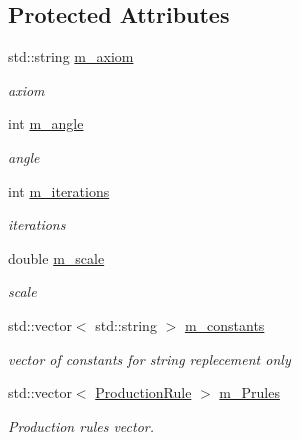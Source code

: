 \subsection*{Protected Attributes}
\begin{DoxyCompactItemize}
\item 
\mbox{\label{class_l_sys_a47cedddf1400255ec6f20f36af55417e}} 
std\+::string \hyperlink{class_l_sys_a47cedddf1400255ec6f20f36af55417e}{m\+\_\+axiom}
\begin{DoxyCompactList}\small\item\em axiom \end{DoxyCompactList}\item 
\mbox{\label{class_l_sys_a49fbe67a18ad078c756886d99e6ac072}} 
int \hyperlink{class_l_sys_a49fbe67a18ad078c756886d99e6ac072}{m\+\_\+angle}
\begin{DoxyCompactList}\small\item\em angle \end{DoxyCompactList}\item 
\mbox{\label{class_l_sys_a26c41bcfbabe1646e9b9579b451153ec}} 
int \hyperlink{class_l_sys_a26c41bcfbabe1646e9b9579b451153ec}{m\+\_\+iterations}
\begin{DoxyCompactList}\small\item\em iterations \end{DoxyCompactList}\item 
\mbox{\label{class_l_sys_ad55ee78715ae84525c69fe34ffc88fd1}} 
double \hyperlink{class_l_sys_ad55ee78715ae84525c69fe34ffc88fd1}{m\+\_\+scale}
\begin{DoxyCompactList}\small\item\em scale \end{DoxyCompactList}\item 
\mbox{\label{class_l_sys_a77ae6ac68fcb2f4a56d9892b1e22ca76}} 
std\+::vector$<$ std\+::string $>$ \hyperlink{class_l_sys_a77ae6ac68fcb2f4a56d9892b1e22ca76}{m\+\_\+constants}
\begin{DoxyCompactList}\small\item\em vector of constants for string replecement only \end{DoxyCompactList}\item 
\mbox{\label{class_l_sys_ac46e8fc62927a3323cd0ba5a3033964c}} 
std\+::vector$<$ \hyperlink{struct_production_rule}{Production\+Rule} $>$ \hyperlink{class_l_sys_ac46e8fc62927a3323cd0ba5a3033964c}{m\+\_\+\+Prules}
\begin{DoxyCompactList}\small\item\em Production rules vector. \end{DoxyCompactList}\end{DoxyCompactItemize}


